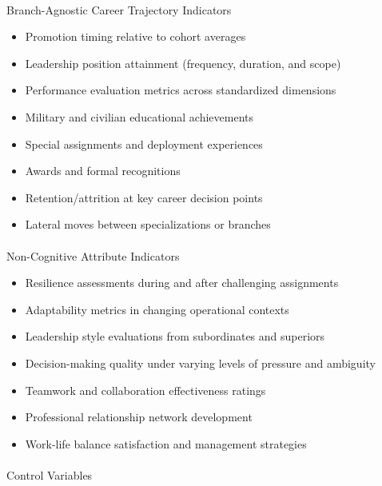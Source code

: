 \documentclass[
  letterpaper,
  DIV=11,
  numbers=noendperiod]{scrartcl}
\makeatletter
\let\oldparagraph\paragraph
\renewcommand{\paragraph}{
    \@ifstar
      \xxxParagraphStar
      \xxxParagraphNoStar
  }
\newcommand{\xxxParagraphStar}[1]{\oldparagraph*{#1}\mbox{}}
\newcommand{\xxxParagraphNoStar}[1]{\oldparagraph{#1}\mbox{}}
\providecommand{\tightlist}{%
  \setlength{\itemsep}{0pt}\setlength{\parskip}{0pt}}
\makeatother
\begin{document}
\paragraph{Branch-Agnostic Career Trajectory
Indicators}\label{branch-agnostic-career-trajectory-indicators}

\begin{itemize}
\tightlist
\item
  Promotion timing relative to cohort averages
\item
  Leadership position attainment (frequency, duration, and scope)
\item
  Performance evaluation metrics across standardized dimensions
\item
  Military and civilian educational achievements
\item
  Special assignments and deployment experiences
\item
  Awards and formal recognitions
\item
  Retention/attrition at key career decision points
\item
  Lateral moves between specializations or branches
\end{itemize}

\paragraph{Non-Cognitive Attribute
Indicators}\label{non-cognitive-attribute-indicators}

\begin{itemize}
\tightlist
\item
  Resilience assessments during and after challenging assignments
\item
  Adaptability metrics in changing operational contexts
\item
  Leadership style evaluations from subordinates and superiors
\item
  Decision-making quality under varying levels of pressure and ambiguity
\item
  Teamwork and collaboration effectiveness ratings
\item
  Professional relationship network development
\item
  Work-life balance satisfaction and management strategies
\end{itemize}

\paragraph{Control Variables}\label{control-variables}
\end{document}
